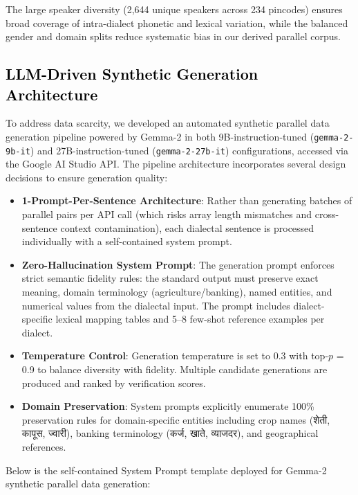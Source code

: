 The large speaker diversity (2,644 unique speakers across 234 pincodes) ensures broad coverage of intra-dialect phonetic and lexical variation, while the balanced gender and domain splits reduce systematic bias in our derived parallel corpus.

\subsection{\textcolor{black}{LLM-Driven Synthetic Generation Architecture}}

To address data scarcity, we developed an automated synthetic parallel data generation pipeline powered by Gemma-2 \cite{gemma2024} in both 9B-instruction-tuned (\texttt{gemma-2-9b-it}) and 27B-instruction-tuned (\texttt{gemma-2-27b-it}) configurations, accessed via the Google AI Studio API. The pipeline architecture incorporates several design decisions to ensure generation quality:

\begin{itemize}
    \item \textbf{1-Prompt-Per-Sentence Architecture}: Rather than generating batches of parallel pairs per API call (which risks array length mismatches and cross-sentence context contamination), each dialectal sentence is processed individually with a self-contained system prompt.
    \item \textbf{Zero-Hallucination System Prompt}: The generation prompt enforces strict semantic fidelity rules: the standard output must preserve exact meaning, domain terminology (agriculture/banking), named entities, and numerical values from the dialectal input. The prompt includes dialect-specific lexical mapping tables and 5--8 few-shot reference examples per dialect.
    \item \textbf{Temperature Control}: Generation temperature is set to 0.3 with top-$p$ = 0.9 to balance diversity with fidelity. Multiple candidate generations are produced and ranked by verification scores.
    \item \textbf{Domain Preservation}: System prompts explicitly enumerate 100\% preservation rules for domain-specific entities including crop names (शेती, कापूस, ज्वारी), banking terminology (कर्ज, खाते, व्याजदर), and geographical references.
\end{itemize}

Below is the self-contained System Prompt template deployed for Gemma-2 synthetic parallel data generation:

